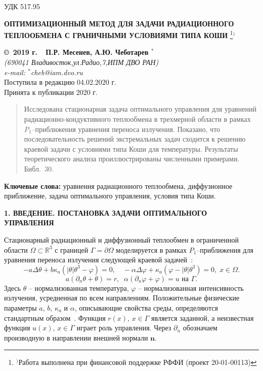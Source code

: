 \documentclass[12pt]{article}
\begin{document}
    УДК 517.95
    \begin{center}
        \textbf{ ОПТИМИЗАЦИОННЫЙ МЕТОД ДЛЯ ЗАДАЧИ РАДИАЦИОННОГО ТЕПЛООБМЕНА С ГРАНИЧНЫМИ УСЛОВИЯМИ ТИПА КОШИ}
        \footnote[{1}]{$^)$Работа выполнена при финансовой поддержке РФФИ (проект 20-01-00113)}$^)$
    \end{center}
    \begin{center}
        \textbf{ \copyright\  2019 г.\ \  П.Р. Месенев, А.Ю. Чеботарев $^{*}$}
        \\
        \textit{(690041 Владивосток,ул.Радио,7,ИПМ ДВО РАН)\\
        e-mail:  $^{*}$cheb@iam.dvo.ru}\\
        {\small  Поступила в редакцию 04.02.2020 г.\\
        Принята к публикации 2020 г.}
    \end{center}

    \sloppy
    \begin{quote}
        \small
        Исследована стационарная задача оптимального управления для уравнений
        радиационно-кондуктивного теплообмена в трехмерной области в рамках
        $P_1$--приближения уравнения переноса излучения.
        Показано, что последовательность решений экстремальных задач
        сходится к решению краевой задачи с условиями типа Коши для температуры.
        Результаты теоретического анализа проиллюстрированы численными примерами.
        Библ.\ 30.
    \end{quote}
    \textbf{Ключевые слова:} уравнения радиационного теплообмена, диффузионное
    приближение, задача оптимального управления, условия типа Коши.

    \begin{center}
        \textbf{1. ВВЕДЕНИЕ. ПОСТАНОВКА ЗАДАЧИ ОПТИМАЛЬНОГО УПРАВЛЕНИЯ}
    \end{center}

    Стационарный радиационный и диффузионный теплообмен в
    ограниченной области $\Omega\subset \mathbb{R}^3$ с границей
    $\Gamma=\partial\Omega$ моделируется в рамках $P_1$--приближения для уравнения
    переноса излучения следующей
    краевой задачей~\cite{Modest,Kovt}:
    \begin{equation}
        \label{eq1}
        - a\Delta\theta + b\kappa_a(|\theta|\theta^3- \varphi)=0,\quad
        -\alpha \Delta \varphi + \kappa_a(\varphi-|\theta|\theta^3)=0,\; x\in\Omega.
    \end{equation}
    \begin{equation}
        \label{bc1}
        a(\partial_n\theta+\theta) = r,\;\; \alpha(\partial_n\varphi+\varphi) = u \text{  на  }\Gamma.
    \end{equation}
    Здесь $\theta$ -- нормализованная температура, $\varphi$ --
    нормализованная интенсивность излучения, усредненная по всем направлениям.
    Положительные физические параметры $a$, $b$, $\kappa_a$ и $\alpha$, описывающие
    свойства среды, определяются стандартным образом~\cite{Kovt}.
    Функция $r(x),\, x\in\Gamma$ является заданной, а неизвестная функция
    $u(x),\, x\in\Gamma$ играет роль управления.
    Через $\partial_n$ обозначаем производную в направлении
    внешней нормали $\mathbf n$.
\end{document}
